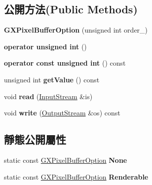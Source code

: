 \subsection*{公開方法(Public Methods)}
\begin{DoxyCompactItemize}
\item 
{\bfseries G\+X\+Pixel\+Buffer\+Option} (unsigned int order\+\_)\hypertarget{class_magnum_1_1_g_x_pixel_buffer_option_a40016e21babedccbd6e31e5d6f869e88}{}\label{class_magnum_1_1_g_x_pixel_buffer_option_a40016e21babedccbd6e31e5d6f869e88}

\item 
{\bfseries operator unsigned int} ()\hypertarget{class_magnum_1_1_g_x_pixel_buffer_option_a0c15204777297f56d1d17bdf70448a4c}{}\label{class_magnum_1_1_g_x_pixel_buffer_option_a0c15204777297f56d1d17bdf70448a4c}

\item 
{\bfseries operator const unsigned int} () const \hypertarget{class_magnum_1_1_g_x_pixel_buffer_option_ac526fb2a5798979e00507faf55e8d9a1}{}\label{class_magnum_1_1_g_x_pixel_buffer_option_ac526fb2a5798979e00507faf55e8d9a1}

\item 
unsigned int {\bfseries get\+Value} () const \hypertarget{class_magnum_1_1_g_x_pixel_buffer_option_a609f9c2465d8a5cb27532037e68d26e5}{}\label{class_magnum_1_1_g_x_pixel_buffer_option_a609f9c2465d8a5cb27532037e68d26e5}

\item 
void {\bfseries read} (\hyperlink{class_magnum_1_1_input_stream}{Input\+Stream} \&is)\hypertarget{class_magnum_1_1_g_x_pixel_buffer_option_ab96280da264f2386eec2aa1db2cddb5a}{}\label{class_magnum_1_1_g_x_pixel_buffer_option_ab96280da264f2386eec2aa1db2cddb5a}

\item 
void {\bfseries write} (\hyperlink{class_magnum_1_1_output_stream}{Output\+Stream} \&os) const \hypertarget{class_magnum_1_1_g_x_pixel_buffer_option_aca92449ca7acb76999c9a12989ae8d83}{}\label{class_magnum_1_1_g_x_pixel_buffer_option_aca92449ca7acb76999c9a12989ae8d83}

\end{DoxyCompactItemize}
\subsection*{靜態公開屬性}
\begin{DoxyCompactItemize}
\item 
static const \hyperlink{class_magnum_1_1_g_x_pixel_buffer_option}{G\+X\+Pixel\+Buffer\+Option} {\bfseries None}\hypertarget{class_magnum_1_1_g_x_pixel_buffer_option_a6bfd8dc0de9c46e15a72052cd21f834d}{}\label{class_magnum_1_1_g_x_pixel_buffer_option_a6bfd8dc0de9c46e15a72052cd21f834d}

\item 
static const \hyperlink{class_magnum_1_1_g_x_pixel_buffer_option}{G\+X\+Pixel\+Buffer\+Option} {\bfseries Renderable}\hypertarget{class_magnum_1_1_g_x_pixel_buffer_option_a8c9a82158adc2e6a2d863972b0be1b40}{}\label{class_magnum_1_1_g_x_pixel_buffer_option_a8c9a82158adc2e6a2d863972b0be1b40}

\end{DoxyCompactItemize}


